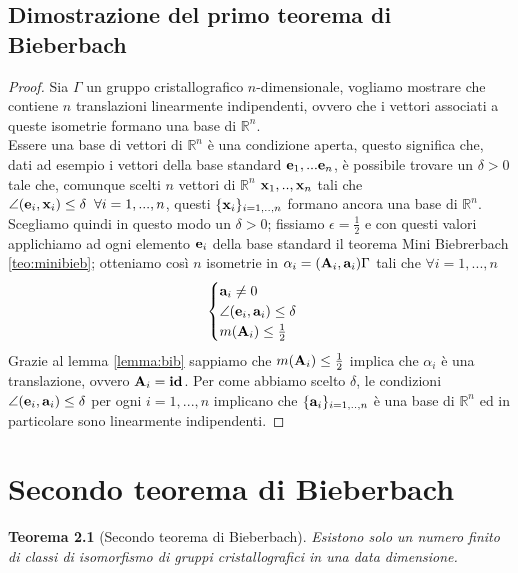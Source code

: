 \documentclass[a4paper,11pt,openright,twoside	]{book}
\newtheorem{theorem}{Teorema}[section]
\begin{document}
\section{Dimostrazione del primo teorema di Bieberbach}
\begin{proof}
Sia $\Gamma$ un gruppo cristallografico $n$-dimensionale, vogliamo mostrare che contiene $n$ translazioni linearmente indipendenti, ovvero che i vettori associati a queste isometrie formano una base di $\mathbb{R}^n$. \\
Essere una base di vettori di $\mathbb{R}^n$ è una condizione aperta, questo significa che, dati ad esempio i vettori della base standard $ \vb{e}_1, ...\vb{e}_n$, è possibile trovare un $\delta>0$  tale che, comunque scelti $n $ vettori di $\mathbb{R}^n$ $\vb{x}_1, .., \vb{x}_n$ tali che $ \angle(\vb{e}_i, \vb{x}_i) \leq \delta   \; \; \forall i = 1, ..., n$, questi $\{\vb{x}_i \}_{i=1,..,n}$ formano ancora una base di $\mathbb{R}^n$.\\
Scegliamo quindi in questo modo un $\delta >0$; fissiamo $\epsilon = \frac{1}{2}$ e con questi valori applichiamo ad ogni elemento $\vb{e}_i$ della base standard il teorema Mini Biebrerbach \ref{teo:minibieb}; otteniamo così $n$ isometrie in $\alpha_i = (\vb{A}_i, \vb{a}_i ) \Gamma$  tali che $\forall i = 1,...,n$
\begin{equation}
\label{ed:ai}
\begin{cases}
\vb{a}_i \neq	0 \\
\angle (\vb{e}_i, \vb{a}_i ) \leq \delta \\
m(\vb{A}_i) \leq \frac{1}{2}
\end{cases}
\end{equation}
Grazie al lemma \ref{lemma:bib} sappiamo che $m(\vb{A}_i) \leq \frac{1}{2}$ implica che $\alpha_i$ è una translazione, ovvero $\vb{A}_i = \vb{id}$. 
Per come abbiamo scelto $\delta$, le condizioni $\angle (\vb{e}_i, \vb{a}_i ) \leq \delta$ per ogni $i= 1,...,n$ implicano che $\{\vb{a}_i \}_{i=1,..,n}$ è una base di $\mathbb{R}^n$ ed in particolare sono linearmente indipendenti.
\end{proof}


\chapter{Secondo teorema di Bieberbach}
\begin{theorem}[Secondo teorema di Bieberbach]
Esistono solo un numero finito di classi di isomorfismo di gruppi cristallografici in una data dimensione. 
\end{theorem}
\end{document}
